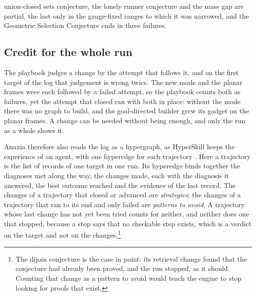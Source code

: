 union-closed sets conjecture, the lonely runner conjecture and the mass gap are partial, the last only in the gauge-fixed ranges to which it was narrowed, and the Geometric Selection Conjecture ends in three failures.

\subsection{Credit for the whole run}\label{ssec:skills}

The playbook judges a change by the attempt that follows it, and on the first target of the log that judgement is wrong twice. The new mode and the planar frames were each followed by a failed attempt, so the playbook counts both as failures, yet the attempt that closed ran with both in place: without the mode there was no graph to build, and the goal-directed builder grew its gadget on the planar frames. A change can be needed without being enough, and only the run as a whole shows it.

Anaxia therefore also reads the log as a hypergraph, as HyperSkill keeps the experience of an agent, with one hyperedge for each trajectory \cite{XYH26}. Here a trajectory is the list of records of one target in one run. Its hyperedge binds together the diagnoses met along the way, the changes made, each with the diagnosis it answered, the best outcome reached and the evidence of the last record. The changes of a trajectory that closed or advanced are \emph{strategies}; the changes of a trajectory that ran to its end and only failed are \emph{patterns to avoid}. A trajectory whose last change has not yet been tried counts for neither, and neither does one that stopped, because a stop says that no checkable step exists, which is a verdict on the target and not on the changes.\footnote{The dijoin conjecture is the case in point: its retrieval change found that the conjecture had already been proved, and the run stopped, as it should. Counting that change as a pattern to avoid would teach the engine to stop looking for proofs that exist.}

